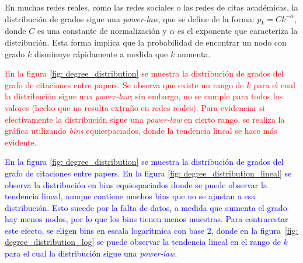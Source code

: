 \documentclass{article}
\begin{document}
En muchas redes reales, como las redes sociales o las redes de citas académicas, la distribución de grados sigue una \textit{power-law}, que se define de la forma: $p_k = Ck^{-\alpha}$, donde $C$ es una constante de normalización y $\alpha$ es el exponente que caracteriza la distribución. Esta forma implica que la probabilidad de encontrar un nodo con grado $k$ disminuye rápidamente a medida que $k$ aumenta.


\textcolor{red}{En la figura \ref{fig: degree_distribution} se muestra la distribución de grados del grafo de citaciones entre papers. Se observa que existe un rango de $k$ para el cual la distribución sigue una \textit{power-law}; sin embargo, no se cumple para todos los valores (hecho que no resulta extraño en redes reales). Para evidenciar si efectivamente la distribución sigue una \textit{power-law} en cierto rango, se realiza la gráfica utilizando \textit{bins} equiespaciados, donde la tendencia lineal se hace más evidente.}

\textcolor{blue}{En la figura \ref{fig: degree_distribution} se muestra la distribución de grados del grafo de citaciones entre papers. En la figura \ref{fig: degree_distribution_lineal} se observa la distribución en bins equiespaciados donde se puede observar la tendencia lineal, aunque contiene muchos bins que no se ajustan a esa distribución. Esto sucede por la falta de datos, a medida que aumenta el grado hay menos nodos, por lo que los bins tienen menos muestras. Para contrarestar este efecto, se eligen bins en escala logarítmica con base 2, donde en la figura~\ref{fig: degree_distribution_log} se puede observar la tendencia lineal en el rango de $k$ para el cual la distribución sigue una \textit{power-law}.}
\end{document}
